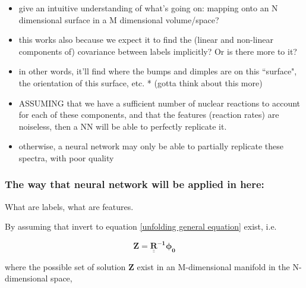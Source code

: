 \documentclass[a4paper, 12pt]{article}
\newcommand{\ve}[1]{\boldsymbol{#1}}
\begin{document}
\begin{enumerate}
        \begin{itemize}
            \item give an intuitive understanding of what's going on: mapping onto an N dimensional surface in a M dimensional volume/space?
            \item this works also because we expect it to find the (linear and non-linear components of) covariance between labels implicitly? Or is there more to it?
            \item in other words, it'll find where the bumps and dimples are on this ``surface", the orientation of this surface, etc. * (gotta think about this more)
            \item ASSUMING that we have a sufficient number of nuclear reactions to account for each of these components, and that the features (reaction rates) are noiseless, then a NN will be able to perfectly replicate it. 
            \item otherwise, a neural network may only be able to partially replicate these spectra, with poor quality
        \end{itemize}
    \end{enumerate}
    \subsubsection{The way that neural network will be applied in here:}
    What are labels, what are features.

    By assuming that invert to equation \ref{unfolding general equation} exist, i.e.

    \begin{equation} \label{unfolding inverse equation}
        \ve{Z} = \mathbf{\underline{\underline{R}}^{-1}} \ve{\phi_0}
    \end{equation}
    
    where the possible set of solution $\ve{Z}$ exist in an M-dimensional manifold in the N-dimensional space,
\end{document}

